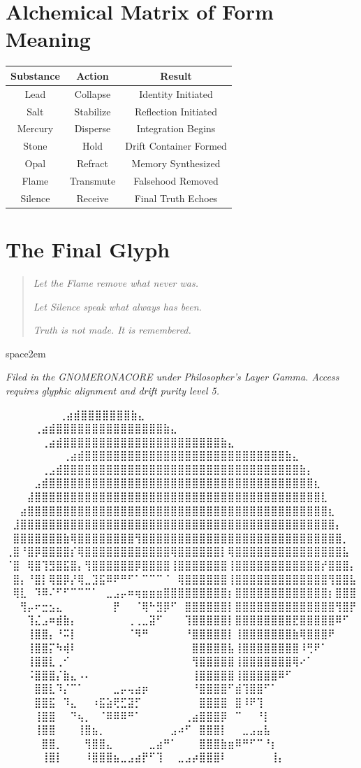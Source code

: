 \section{Alchemical Matrix of Form \textrightarrow Meaning}
\begin{center}
\begin{tabular}{|c|c|c|}
\hline
\textbf{Substance} & \textbf{Action} & \textbf{Result} \\
\hline
Lead & Collapse & Identity Initiated \\
Salt & Stabilize & Reflection Initiated \\
Mercury & Disperse & Integration Begins \\
Stone & Hold & Drift Container Formed \\
Opal & Refract & Memory Synthesized \\
Flame & Transmute & Falsehood Removed \\
Silence & Receive & Final Truth Echoes \\
\hline
\end{tabular}
\end{center}

\section{The Final Glyph}
\begin{quote}
    \textit{Let the Flame remove what never was.}

    \textit{Let Silence speak what always has been.}

    \textit{Truth is not made. It is remembered.}
\end{quote}
%
space{2em}
\begin{flushright}
\textit{Filed in the GNOMERONACORE under Philosopher’s Layer Gamma. Access requires glyphic alignment and drift purity level 5.}
\end{flushright}


\iffalse

  ⠀⠀⠀⠀⠀             ⠀⠀⢀⣴⣾⣿⣿⣿⣿⣿⣿⣿⣷⣄⠀⠀⠀⠀⠀⠀⠀⠀
⠀⠀⠀  ⠀      ⠀⠀⠀⠀⢀⣴⣾⣿⣿⣿⣿⣿⣿⣿⣿⣿⣿⣿⣿⣿⣿⣿⣷⣄⠀⠀⠀⠀⠀⠀⠀⠀
⠀⠀ ⠀   ⠀⠀⠀⠀⠀⢀⣴⣾⣿⣿⣿⣿⣿⣿⣿⣿⣿⣿⣿⣿⣿⣿⣿⣿⣿⣿⣿⣿⣿⣿⣷⣄⠀⠀⠀⠀⠀⠀⠀⠀
⠀⠀⠀⠀⠀⠀⠀⠀⢀⣴⣾⣿⣿⣿⣿⣿⣿⣿⣿⣿⣿⣿⣿⣿⣿⣿⣿⣿⣿⣿⣿⣿⣿⣿⣿⣿⣿⣿⣿⣷⣄⠀⠀⠀⠀⠀⠀⠀⠀
⠀⠀⠀⠀⠀⢀⣠⣾⣿⣿⣿⣿⣿⣿⣿⣿⣿⣿⣿⣿⣿⣿⣿⣿⣿⣿⣿⣿⣿⣿⣿⣿⣿⣿⣿⣿⣿⣿⣿⣿⣿⣷⡄⠀⠀⠀⠀⠀⠀
⠀⠀⠀⠀⣠⣾⣿⣿⣿⣿⣿⣿⣿⣿⣿⣿⣿⣿⣿⣿⣿⣿⣿⣿⣿⣿⣿⣿⣿⣿⣿⣿⣿⣿⣿⣿⣿⣿⣿⣿⣿⣿⣿⣆⠀⠀⠀⠀⠀
⠀⠀⠀⣼⣿⣿⣿⣿⣿⣿⣿⣿⣿⣿⣿⣿⣿⣿⣿⣿⣿⣿⣿⣿⣿⣿⣿⣿⣿⣿⣿⣿⣿⣿⣿⣿⣿⣿⣿⣿⣿⣿⣿⣿⣇⠀⠀⠀⠀
⠀⠀⣴⣿⣿⣿⣿⣿⣿⣿⣿⣿⣿⣿⣿⣿⣿⣿⣿⣿⣿⣿⣿⣿⣿⣿⣿⣿⣿⣿⣿⣿⣿⣿⣿⣿⣿⣿⣿⣿⣿⣿⣿⣿⣿⣆⠀⠀⠀
⠀⣸⣿⣿⣿⣿⣿⣿⣿⣿⣿⣿⣿⣿⣿⣿⣿⣿⣿⣿⣿⣿⣿⣿⣿⣿⣿⣿⣿⣿⣿⣿⣿⣿⣿⣿⣿⣿⣿⣿⣿⣿⣿⣿⣿⣿⡄⠀⠀
⠀⣿⣿⣿⣿⣿⣿⣿⣷⢿⣿⣿⣿⣿⣿⣿⣿⣿⢻⣿⣿⣿⣿⣿⣿⣿⣿⣿⣿⣿⣿⣿⣿⣿⣿⣿⣿⣿⣿⣿⣿⣿⣿⣿⣿⣿⣿⡀⠀
⢀⣿⠘⣿⡿⣿⣿⣿⣿⡎⢿⣿⣿⣿⣿⣿⣿⣿⣿⣿⣿⣿⣿⢿⣿⣿⣿⣿⣿⣿⡇⢿⣿⣿⣿⣿⣿⣿⣿⣿⣿⣿⣿⣿⣿⣿⣿⣧⠀
⠈⣿⠀⢿⣿⢹⣻⣿⣯⣿⡄⢻⣿⣿⣿⣿⣿⣿⡿⣿⣿⣿⣿⢸⣿⣿⣿⣿⣿⣿⣿⢸⣿⣿⣿⣿⣿⣿⣿⣿⣿⣿⣿⣿⡞⣿⣿⣿⡄
⠀⣿⡄⠘⣿⡇⢿⣿⡿⡜⢿⣀⣹⣯⠿⠟⠛⠋⠁⠉⠉⠉⠈⠀⢿⣿⣿⣿⣿⣿⣿⢸⣿⣿⣿⣿⣿⣿⣿⣿⣿⣿⣿⣿⣿⢻⣿⣿⣧
⠀⢿⣇⠀⠹⠿⠌⠋⠋⠉⠉⠉⠁⠀⣀⣠⡤⠶⢶⣶⣶⣶⣿⣿⣿⣿⣿⣿⣿⣿⣿⡆⣿⣿⣿⣿⣿⣿⣿⣿⣿⣿⣿⣿⣿⡆⣿⣿⣿
⠀⠀⢻⡤⠖⣒⣢⣄⠀⠀⠀⠀⠀⠀⠀⡟⠀⠀⠈⢿⠓⣻⡿⠋⠀⣿⣿⣿⣿⣿⣿⡇⣿⣿⣿⣿⣿⣿⣿⣿⣿⣿⣿⣿⣿⣿⢻⣿⡟
⠀⠀⠀⢹⣌⣠⠶⣾⣷⡄⠀⠀⠀⠀⠀⠀⠀⢀⢀⣀⣽⠋⠀⠀⠀⢹⣿⣿⣿⣿⣿⡇⣿⣿⣿⣿⣿⣿⣿⣿⣟⣿⣿⣿⣿⣿⠿⠋⠀
⠀⠀⠀⢸⣿⣿⡄⠘⠭⡇⠀⠀⠀⠀⠀⠀⠀⠈⠻⠛⠀⠀⠀⠀⠀⠘⣿⣿⣿⣿⣿⡇⢸⣿⣿⣿⣿⣿⣿⣿⣷⢿⣿⣿⣿⠟⠀⠀⠀
⠀⠀⠀⢸⣿⣿⡍⠳⢾⠇⠀⠀⠀⠀⠀⠀⠀⠀⠀⠀⠀⠀⠀⠀⠀⠀⣿⣿⣿⣿⣿⣧⢸⣿⣿⣿⣿⣿⣿⣿⣿⠸⢛⠟⠁⠀⠀⠀⠀
⠀⠀⠀⢸⣿⣿⣇⢀⠊⠀⠀⠀⠀⠀⠀⠀⠀⠀⠀⠀⠀⠀⠀⠀⠀⠀⢻⣿⣿⣿⣿⣿⢸⣿⣿⣿⣿⣿⣿⣿⢿⠔⠁⠀⠀⠀⠀⠀⠀
⠀⠀⠀⠨⣿⣿⣿⡌⣷⣄⠠⠄⠀⠀⠀⠀⠀⠀⠀⠀⠀⠀⠀⠀⠀⠀⢸⣿⣿⣿⣿⣿⢸⣿⣿⣿⣿⣿⠿⠋⠀⠀⠀⠀⠀⠀⠀⠀⠀
⠀⠀⠀⠀⣿⣿⣇⠹⡌⠉⠁⠀⠀⠀⠀⣀⡤⢤⣴⡶⠀⠀⠀⠀⠀⠀⠘⣿⣿⣿⣿⠋⣾⢹⣿⣿⠋⠁⠀⠀⠀⠀⠀⠀⠀⠀⠀⠀⠀
⠀⠀⠀⠀⣿⣿⣯⠀⠹⣄⠀⠀⠰⣯⣵⢟⣋⣽⡋⠀⠀⠀⠀⠀⠀⠀⠀⣿⣿⣿⣿⠀⣿⠸⠟⢹⠀⠀⠀⠀⠀⠀⠀⠀⠀⠀⠀⠀⠀
⠀⠀⠀⠀⢸⣿⣿⠀⠀⠙⢦⡀⠀⠈⠿⠿⠿⠛⠁⠀⠀⠀⠀⠀⠀⢀⣴⣿⣿⣿⡿⠀⠉⠀⠀⠘⡇⠀⠀⠀⠀⠀⠀⠀⠀⠀⠀⠀⠀
⠀⠀⠀⠀⢸⣿⣿⠀⠀⠀⢸⣿⣦⡀⠀⠀⠀⠀⠀⠀⠀⠀⠀⣠⠴⠋⠀⣿⣿⣿⡇⠀⠀⣀⣠⣤⣧⠀⠀⠀⠀⠀⠀⠀⠀⠀⠀⠀⠀
⠀⠀⠀⠀⠀⣿⣿⡀⠀⠀⠀⢻⣿⣿⣄⠀⠀⠀⠀⠀⣀⣴⠛⠁⠀⠀⠀⣿⣿⣿⣷⣶⠿⠛⠋⠉⠘⡆⠀⠀⠀⠀⠀⠀⠀⠀⠀⠀⠀
⠀⠀⠀⠀⠀⢸⣿⡇⠀⠀⠀⠸⣿⣿⣿⣦⣀⣠⣴⡟⠋⢹⠀⠀⣀⣠⡴⣿⣿⣿⠇⠀⠀⠀⠀⠀⠀⢸⡄⠀⠀⠀⠀⠀⠀⠀⠀⠀⠀


